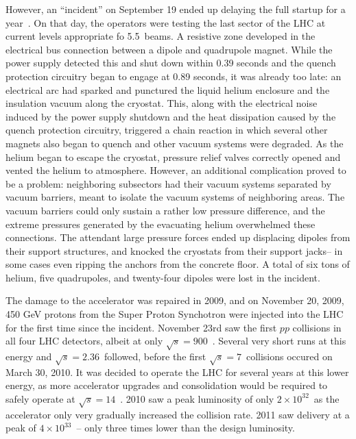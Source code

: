 
However, an ``incident'' on September 19 ended up delaying the full startup for a year~\cite{Incident}. On that day, the operators were testing the last sector of the LHC at current levels appropriate fo 5.5~\TeV beams. A resistive zone developed in the electrical bus connection between a dipole and quadrupole magnet. While the power supply detected this and shut down within 0.39 seconds and the quench protection circuitry began to engage at 0.89 seconds, it was already too late: an electrical arc had sparked and punctured the liquid helium enclosure and the insulation vacuum along the cryostat. This, along with the electrical noise induced by the power supply shutdown and the heat dissipation caused by the quench protection circuitry, triggered a chain reaction in which several other magnets also began to quench and other vacuum systems were degraded. As the helium began to escape the cryostat, pressure relief valves correctly opened and vented the helium to atmosphere. However, an additional complication proved to be a problem: neighboring subsectors had their vacuum systems separated by vacuum barriers, meant to isolate the vacuum systems of neighboring areas. The vacuum barriers could only sustain a rather low pressure difference, and the extreme pressures generated by the evacuating helium overwhelmed these connections. The attendant large pressure forces ended up displacing dipoles from their support structures, and knocked the cryostats from their support jacks-- in some cases even ripping the anchors from the concrete floor. A total of six tons of helium, five quadrupoles, and twenty-four dipoles were lost in the incident. 

The damage to the accelerator was repaired in 2009, and on November 20, 2009, 450 GeV protons from the Super Proton Synchotron were injected into the LHC for the first time since the incident. November 23rd saw the first $pp$ collisions in all four LHC detectors, albeit at only $\sqrt{s} = 900$~\GeV. Several very short runs at this energy and $\sqrt{s} = 2.36$~\TeV followed, before the first $\sqrt{s} = 7$~\TeV collisions occured on March 30, 2010. It was decided to operate the LHC for several years at this lower energy, as more accelerator upgrades and consolidation would be required to safely operate at $\sqrt{s} = 14$~\TeV. 2010 saw a peak luminosity of only $2\times10^{32}$~\lumirate as the accelerator only very gradually increased the collision rate. 2011 saw delivery at a peak of $4 \times 10^{33}$~\lumirate-- only three times lower than the design luminosity.

